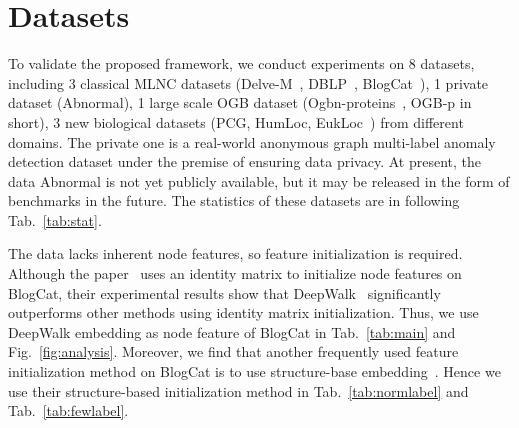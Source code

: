 




\section{Datasets} \label{app:datasets}
To validate the proposed framework, we conduct experiments on 8 datasets, including 3 classical MLNC datasets (Delve-M~\citep{8970680}, DBLP~\citep{8970680}, BlogCat~\citep{8894391}), 1 private dataset (Abnormal), 1 large scale OGB dataset (Ogbn-proteins~\citep{hu2020open}, OGB-p in short), 3 new biological datasets (PCG, HumLoc, EukLoc~\citep{zhao2023multi}) from different domains. 
The private one is a real-world anonymous graph multi-label anomaly detection dataset under the premise of ensuring data privacy. At present, the data Abnormal is not yet publicly available, but it may be released in the form of benchmarks in the future. 
The statistics of these datasets are in following Tab.~\ref{tab:stat}.

 The data lacks inherent node features, so feature initialization is required.
Although the paper~\citep{zhao2023multi} uses an identity matrix to initialize node features on BlogCat, their experimental results show that DeepWalk~\citep{Perozzi_2014} significantly outperforms other methods using identity matrix initialization.
Thus, we use DeepWalk embedding as node feature of BlogCat in Tab.~\ref{tab:main} and Fig.~\ref{fig:analysis}.
Moreover, we find that another frequently used feature initialization method on BlogCat is to use structure-base embedding~\citep{qiu2020gcc}. Hence we use their structure-based initialization method in Tab.~\ref{tab:normlabel} and Tab.~\ref{tab:fewlabel}.

